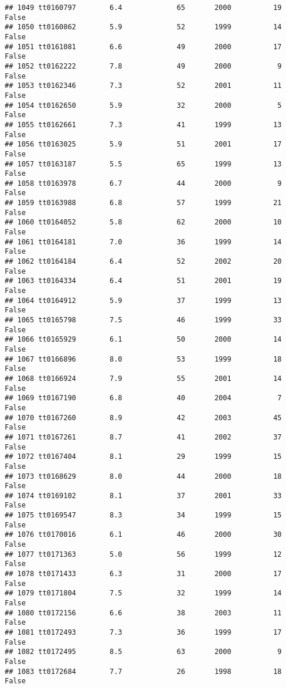 \documentclass[
]{article}
\begin{document}
\begin{verbatim}
## 1049 tt0160797        6.4             65       2000          19   False
## 1050 tt0160862        5.9             52       1999          14   False
## 1051 tt0161081        6.6             49       2000          17   False
## 1052 tt0162222        7.8             49       2000           9   False
## 1053 tt0162346        7.3             52       2001          11   False
## 1054 tt0162650        5.9             32       2000           5   False
## 1055 tt0162661        7.3             41       1999          13   False
## 1056 tt0163025        5.9             51       2001          17   False
## 1057 tt0163187        5.5             65       1999          13   False
## 1058 tt0163978        6.7             44       2000           9   False
## 1059 tt0163988        6.8             57       1999          21   False
## 1060 tt0164052        5.8             62       2000          10   False
## 1061 tt0164181        7.0             36       1999          14   False
## 1062 tt0164184        6.4             52       2002          20   False
## 1063 tt0164334        6.4             51       2001          19   False
## 1064 tt0164912        5.9             37       1999          13   False
## 1065 tt0165798        7.5             46       1999          33   False
## 1066 tt0165929        6.1             50       2000          14   False
## 1067 tt0166896        8.0             53       1999          18   False
## 1068 tt0166924        7.9             55       2001          14   False
## 1069 tt0167190        6.8             40       2004           7   False
## 1070 tt0167260        8.9             42       2003          45   False
## 1071 tt0167261        8.7             41       2002          37   False
## 1072 tt0167404        8.1             29       1999          15   False
## 1073 tt0168629        8.0             44       2000          18   False
## 1074 tt0169102        8.1             37       2001          33   False
## 1075 tt0169547        8.3             34       1999          15   False
## 1076 tt0170016        6.1             46       2000          30   False
## 1077 tt0171363        5.0             56       1999          12   False
## 1078 tt0171433        6.3             31       2000          17   False
## 1079 tt0171804        7.5             32       1999          14   False
## 1080 tt0172156        6.6             38       2003          11   False
## 1081 tt0172493        7.3             36       1999          17   False
## 1082 tt0172495        8.5             63       2000           9   False
## 1083 tt0172684        7.7             26       1998          18   False

\end{verbatim}
\end{document}
